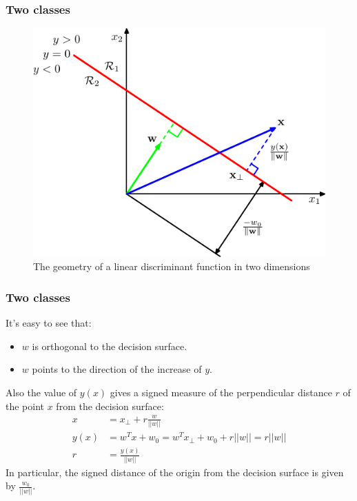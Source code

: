 \documentclass{beamer}
\begin{document}
\begin{frame}
    \frametitle{Two classes}
    \begin{figure}
        \caption{The geometry of a linear discriminant function in two dimensions}
        \includegraphics[height=0.6\textheight]{Figure_1.pdf}
    \end{figure}
\end{frame}

\begin{frame}
    \frametitle{Two classes}
    It's easy to see that:
    \begin{itemize}
        \item $w$ is orthogonal to the decision surface.
        \item $w$ points to the direction of the increase of $y$.
    \end{itemize}
    Also the value of $y(x)$ gives a signed measure of the perpendicular distance $r$ of the point $x$ from the decision surface:
    \begin{align*}
        x&=x_{\perp}+r\frac{w}{||w||} \\
        y(x)&=w^{T}x+w_{0}=w^{T}x_{\perp}+w_{0}+r||w||=r||w|| \\
        r&=\frac{y(x)}{||w||}
    \end{align*}
    In particular, the signed distance of the origin from the decision surface is given by $\frac{w_{0}}{||w||}$.
\end{frame}
\end{document}
